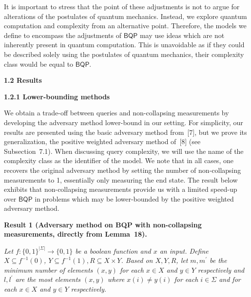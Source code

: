 It is important to stress that the point of these adjustments is not to argue for alterations of the postulates of quantum mechanics. Instead, we explore quantum computation and complexity from an alternative point. Therefore, the models we define to encompass the adjustments of $\mathsf{BQP}$ may use ideas which are not inherently present in quantum computation. This is unavoidable as if they could be described solely using the postulates of quantum mechanics, their complexity class would be equal to $\mathsf{BQP}$.\par





\par\medskip\noindent\textbf{
1.2 Results}\par




\par\medskip\noindent\textbf{
1.2.1 Lower-bounding methods}\par




We obtain a trade-off between queries and non-collapsing measurements by developing the adversary method lower-bound in our setting. For simplicity, our results are presented using the basic adversary method from [7], but we prove its generalization, the positive weighted adversary method of [8] (see Subsection 7.1). When discussing query complexity, we will use the name of the complexity class as the identifier of the model. We note that in all cases, one recovers the original adversary method by setting the number of non-collapsing measurements to 1, essentially only measuring the end state. The result below exhibits that non-collapsing measurements provide us with a limited speed-up over $\mathsf{BQP}$ in problems which may be lower-bounded by the positive weighted adversary method.\par





\par\medskip\noindent\textbf{
\textbf{Result 1}\textbf{ }(\textbf{Adversary method on BQP with non-collapsing measurements}, directly from Lemma 18)\textbf{.}
}\par



\emph{Let $f:\{0,1\}^{|\Sigma|}\rightarrow\{0,1\}$ be a boolean function and $x$ an input.
Define $X\subseteq f^{-1}(0)$, $Y\subseteq f^{-1}(1),R\subseteq X\times Y$. Based on $X,Y,R$, let $m,m^{\prime}$ be the minimum number of elements $(x,y)$ for each $x\in X$ and $y\in Y$ respectively and $l,l^{\prime}$ are the most elements $(x,y)$ where $x(i)\neq y(i)$ for each $i\in\Sigma$ and for each $x\in X$ and $y\in Y$ respectively.}\par




